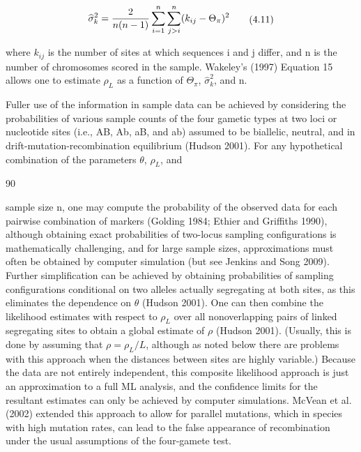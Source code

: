\documentclass{article}
\begin{document}
\begin{equation}
\begin{align*}\widehat{\sigma}_k^2={2\over n(n-1)}\sum_{i=1}^n\sum_{j>i}^n(k_{ij}-\Theta_\pi)^2\end{align*}
\tag{4.11}
\label{eq:4_11}
\end{equation}

where  $ k_{ij} $ is the number of sites at which sequences i and j differ, and n is the number of chromosomes scored in the sample. Wakeley's (1997) Equation 15 allows one to estimate  $ \rho_L $ as a function of  $ \Theta_\pi $,  $ \widehat{\sigma}_k^2 $, and n.

Fuller use of the information in sample data can be achieved by considering the probabilities of various sample counts of the four gametic types at two loci or nucleotide sites (i.e., AB, Ab, aB, and ab) assumed to be biallelic, neutral, and in drift-mutation-recombination equilibrium (Hudson 2001). For any hypothetical combination of the parameters  $ \theta $,  $ \rho_{L} $, and

90

sample size n, one may compute the probability of the observed data for each pairwise combination of markers (Golding 1984; Ethier and Griffiths 1990), although obtaining exact probabilities of two-locus sampling configurations is mathematically challenging, and for large sample sizes, approximations must often be obtained by computer simulation (but see Jenkins and Song 2009). Further simplification can be achieved by obtaining probabilities of sampling configurations conditional on two alleles actually segregating at both sites, as this eliminates the dependence on  $ \theta $ (Hudson 2001). One can then combine the likelihood estimates with respect to  $ \rho_{L} $ over all nonoverlapping pairs of linked segregating sites to obtain a global estimate of  $ \rho $ (Hudson 2001). (Usually, this is done by assuming that  $ \rho = \rho_{L}/L $, although as noted below there are problems with this approach when the distances between sites are highly variable.) Because the data are not entirely independent, this composite likelihood approach is just an approximation to a full ML analysis, and the confidence limits for the resultant estimates can only be achieved by computer simulations. McVean et al. (2002) extended this approach to allow for parallel mutations, which in species with high mutation rates, can lead to the false appearance of recombination under the usual assumptions of the four-gamete test.
\end{document}
